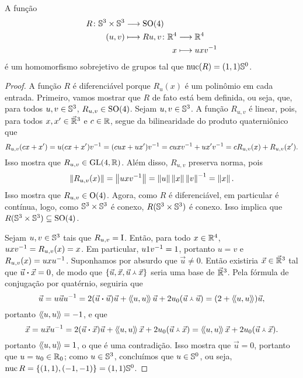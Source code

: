 \begin{definition}
A função
	\begin{align*}
	\func{R}{\S^3 \times \S^3}{\SO(4)}{(u,v)}{
		\begin{aligned}[t]
		\func{R{u,v}}{\R^4}{\R^4}{x}{uxv\inv}
		\end{aligned}
	}
	\end{align*}
é um homomorfismo sobrejetivo de grupos tal que $\nuc(R) = (1,1)\S^0$.
\end{definition}
\begin{proof}
A função $R$ é diferenciável porque $R_u(x)$ é um polinômio em cada entrada. Primeiro, vamos mostrar que $R$ de fato está bem definida, ou seja, que, para todos $u,v \in \S^3$, $R_{u,v} \in \SO(4)$. Sejam $u,v \in \S^3$. A função $R_{u,v}$ é linear, pois, para todos $x,x' \in \vec{\R}^3$ e $c \in \R$, segue da bilinearidade do produto quaterniônico que
	\begin{equation*}
	R_{u,v}(cx+x') = u(cx+x')v\inv = (cux+ux')v\inv = cuxv\inv + ux'v\inv = cR_{u,v}(x) + R_{u,v}(x').
	\end{equation*}
Isso mostra que $R_{u,v} \in \GL(4,\R)$. Além disso, $R_{u,v}$ preserva norma, pois
	\begin{equation*}
	\nor{R_{u,v}(x)} = \nor{uxv\inv} = \nor{u}\nor{x}\nor{v}\inv = \nor{x}.
	\end{equation*}
Isso mostra que $R_{u,v} \in \OO(4)$. Agora, como $R$ é diferenciável, em particular é contínua, logo, como $\S^3 \times \S^3$ é conexo, $R(\S^3 \times \S^3)$ é conexo. Isso implica que $R(\S^3 \times \S^3) \subseteq \SO(4)$.

Sejam $u,v \in \S^3$ tais que $R_{u,v} = \Id$. Então, para todo $x \in \R^4$, $uxv\inv = R_{u,v}(x) = x$. Em particular, $u1v\inv = 1$, portanto $u=v$ e $R_{u,v}(x) = uxu\inv$. Suponhamos por absurdo que $\vec{u} \neq 0$. Então existiria $\vec{x} \in \vec{\R}^3$ tal que $\pesc{\vec{u}}{\vec{x}} = 0$, de modo que $\{\vec{u},\vec{x},\pvec{\vec{u}}{\vec{x}}\}$ seria uma base de $\vec{\R}^3$. Pela fórmula de conjugação por quatérnio, seguiria que
	\begin{equation*}
	\vec{u} = u\vec{u}u\inv = 2(\pesc{\vec{u}}{\vec{u}})\vec{u} + \inteq{u}{u}\vec{u} + 2 \esc{u}(\pvec{\vec{u}}{\vec{u}}) = (2+\inteq{u}{u})\vec{u},
	\end{equation*}
portanto $\inteq{u}{u} = -1$, e que
	\begin{equation*}
	\vec{x} = u\vec{x}u\inv = 2(\pesc{\vec{u}}{\vec{x}})\vec{u} + \inteq{u}{u}\vec{x} + 2 \esc{u}(\pvec{\vec{u}}{\vec{x}}) = \inteq{u}{u}\vec{x} + 2\esc{u}(\pvec{\vec{u}}{\vec{x}}).
	\end{equation*}
portanto $\inteq{u}{u}=1$, o que é uma contradição. Isso mostra que $\vec{u} = 0$, portanto que $u = \esc{u} \in \esc{\R}$; como $u \in \S^3$, concluímos que $u \in \S^0$, ou seja, $\nuc{R} = \{(1,1),(-1,-1)\} = (1,1)\S^0$.


\end{proof}
